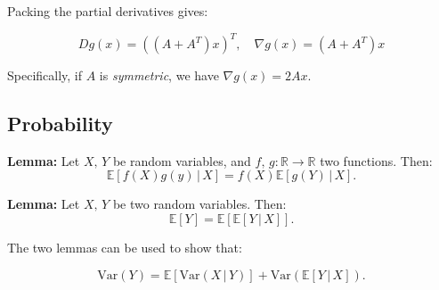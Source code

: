 \documentclass[a4paper]{extarticle}
\begin{document}
Packing the partial derivatives gives:

\[
    Dg(x) = ((A + A^T)x)^T, \quad \nabla g(x) = (A + A^T)x
\]

Specifically, if \(A\) is \textit{symmetric}, we have \(\nabla g(x) = 2Ax\).

\subsection{Probability}

\begin{cbox}
    \textbf{Lemma:} Let \(X, \, Y\) be random variables, and \(f, \, g : \mathbb{R} \to \mathbb{R}\) two functions. Then:
    \[
        \mathbb{E}[f(X)g(y) \, | \, X] = f(X) \mathbb{E}[g(Y) \, | \, X].
    \]
\end{cbox}

\begin{cbox}
    \textbf{Lemma:} Let \(X, \, Y\) be two random variables. Then:
    \[
        \mathbb{E}[Y] = \mathbb{E}[\mathbb{E}[Y \, | \, X]].
    \]
\end{cbox}

The two lemmas can be used to show that:

\[
    \text{Var} (Y) = \mathbb{E}[\text{Var} (X \, | \, Y)] + \text{Var} (\mathbb{E}[Y \, | \, X]).
\]
\end{document}
